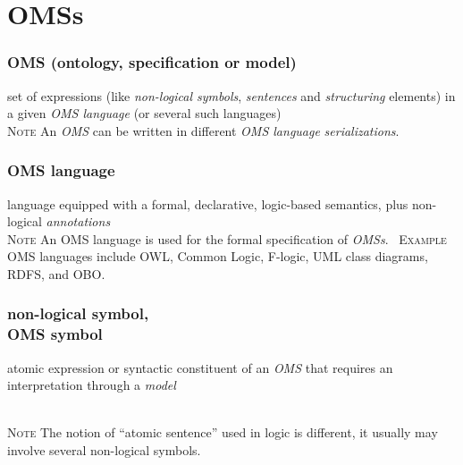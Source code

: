 \documentclass[10pt,%
\ifpretendfinal
final%
\else
draft%
\fi,
]{scrreprt}
\newcommand*{\termref}[1]{\textit{#1}}
\newcommand*{\synonym}{,\\}
\newcommand{\sclause}[1]{\section{#1}}
\newcommand{\termdefinition}[2]{\subsubsection*{\normalsize #1}#2}
\newenvironment{definitions}[0]{\medskip }{}
\newenvironment{note}[0]{\ \\ \textsc{Note} \quad}{}
\newenvironment{example}[0]{\ \newline \textsc{Example}\quad }{}
\begin{document}
\sclause{OMSs}

\begin{definitions}

  \termdefinition{OMS (ontology, specification or model)}{set of expressions (like \termref{non-logical symbols}, \termref{sentences} and \termref{structuring} elements) in a given \termref{OMS language} (or several such languages)}%
\begin{note}
	An \termref{OMS} can be written in different \termref{OMS language} \termref{serializations}.
\end{note}	

  \termdefinition{OMS language}{language equipped with a formal, declarative, logic-based semantics, plus non-logical \termref{annotations}}
  \begin{note}
  An OMS language is used for the formal specification of \termref{OMSs}.
  \end{note}
  \begin{example}
    OMS languages include OWL, Common Logic, F-logic, UML class diagrams, RDFS, and OBO.
  \end{example}


  \termdefinition{non-logical symbol\synonym OMS symbol}{atomic expression or syntactic constituent of an \termref{OMS} that requires an interpretation through a \termref{model}}

  \begin{note}
  The notion of ``atomic sentence'' used in logic is different, it usually
  may involve several non-logical symbols.
  \end{note}


\end{definitions}
\end{document}

